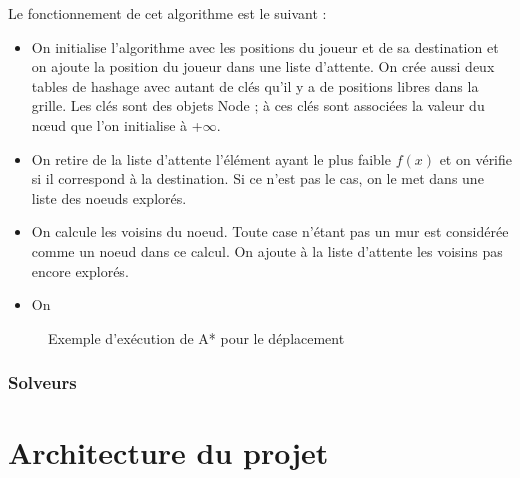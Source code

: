 \documentclass[a4paper,12pt]{article} %
\begin{document}
Le fonctionnement de cet algorithme est le suivant :\\

\begin{itemize}
\item On initialise l'algorithme avec les positions du joueur et de sa destination et on ajoute la position du joueur dans une liste d'attente. On crée aussi deux tables de hashage avec autant de clés qu'il y a de positions libres dans la grille. Les clés sont des objets Node ; à ces clés sont associées la valeur du nœud que l'on initialise à +$\infty$.
\item On retire de la liste d'attente l'élément ayant le plus faible $f(x)$ et on vérifie si il correspond à la destination. Si ce n'est pas le cas, on le met dans une liste des noeuds explorés.
\item On calcule les voisins du noeud. Toute case n'étant pas un mur est considérée comme un noeud dans ce calcul. On ajoute à la liste d'attente les voisins pas encore explorés.
\item On 
\end{itemize}
  
\begin{figure}[!h]
\centering
{}
\caption{Exemple d'exécution de A* pour le déplacement}
\end{figure}

\subsubsection{Solveurs}

\section{Architecture du projet}
\end{document}
